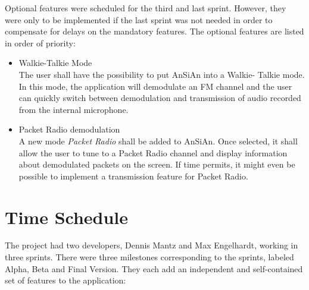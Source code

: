 Optional features were scheduled for the third and last sprint. However,
they were only to be implemented if the last sprint was not needed
in order to compensate for delays on the mandatory features. The optional features are
listed in order of priority:
\begin{itemize}
	\item Walkie-Talkie Mode \\
		The user shall have the possibility to put \ac{AnSiAn} into a Walkie-
		Talkie mode. In this mode, the application will demodulate an FM channel
		and the user can quickly switch between demodulation and transmission
		of audio recorded from the internal microphone.
	\item Packet Radio demodulation\\
		A new mode \emph{Packet Radio} shall be added to \ac{AnSiAn}. Once selected, it shall allow the user
		to tune to a Packet Radio channel and display information about 
		demodulated packets on the screen. If time permits, it might even
		be possible to implement a transmission feature for Packet Radio.
\end{itemize}


\section{Time Schedule}
\label{sec:time_schedule}

The project had two developers, Dennis Mantz and Max Engelhardt,
working in three sprints. There were three milestones corresponding to
the sprints, labeled Alpha, Beta and Final Version. They each add an independent
and self-contained set of features to the application:

